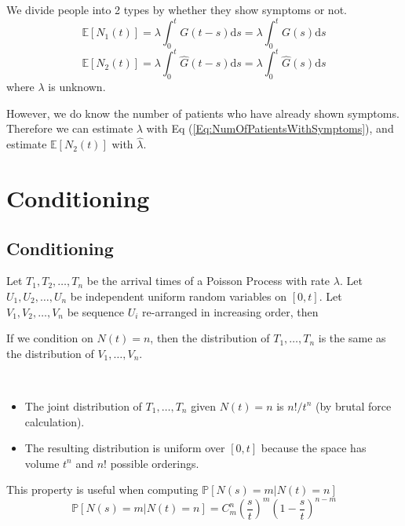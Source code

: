         We divide people into 2 types by whether they show symptoms or not.
        \begin{equation}\label{Eq:NumOfPatientsWithSymptoms} \mathbb{E}[N_1(t)] = \lambda \int_0^t G(t-s)\mathrm{d}s = \lambda\int_0^t G(s)\mathrm{d}s \end{equation}
        \[ \mathbb{E}[N_2(t)] = \lambda \int_0^t \hat{G}(t-s)\mathrm{d}s = \lambda\int_0^t \hat{G}(s)\mathrm{d}s \]
        where $\lambda$ is unknown.

        However, we do know the number of patients who have already shown symptoms. Therefore we can estimate $\lambda$ with Eq (\ref{Eq:NumOfPatientsWithSymptoms}), and estimate $\mathbb{E}[N_2(t)]$ with $\hat{\lambda}$.

\section{Conditioning}

    \subsection{Conditioning}
        Let $T_1, T_2, \dots, T_n$ be the arrival times of a Poisson Process with rate $\lambda$. Let $U_1, U_2, \dots, U_n$ be independent uniform random variables on $[0,t]$. Let $V_1, V_2, \dots, V_n$ be sequence $U_i$ re-arranged in increasing order, then
        \begin{theorem}[Conditioning]\label{Thm:ConditioningOfPoissonProcess}
            If we condition on $N(t)=n$, then the distribution of $T_1, \dots, T_n$ is the same as the distribution of $V_1, \dots, V_n$.
        \end{theorem}
        \begin{sketchproof}~{}
            \begin{itemize}
                \item The joint distribution of $T_1,\dots,T_n$ given $N(t)=n$ is $n!/t^n$ (by brutal force calculation).
                \item The resulting distribution is uniform over $[0,t]$ because the space has volume $t^n$ and $n!$ possible orderings.
            \end{itemize}
        \end{sketchproof}
        \begin{remark}
            This property is useful when computing $\mathbb{P}[N(s)=m|N(t)=n]$
            \[ \mathbb{P}[N(s)=m|N(t)=n] = C^n_m \left(\frac{s}{t}\right)^m\left(1-\frac{s}{t}\right)^{n-m} \]
        \end{remark}


